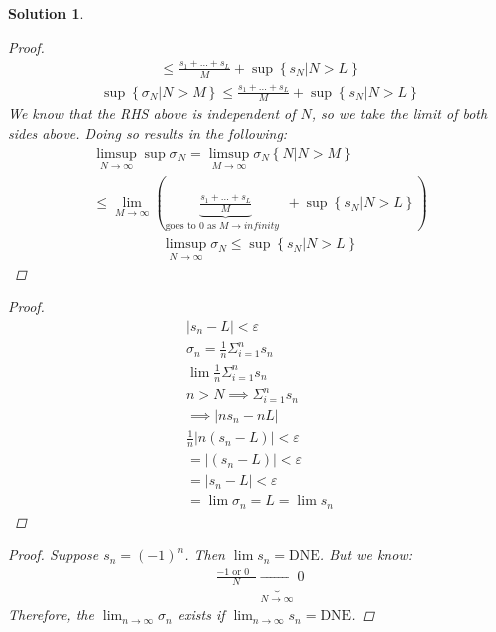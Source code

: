\documentclass[12pt]{article}
\newtheorem{solution}{Solution}
\begin{document}
\begin{solution}
\begin{enumerate}
\begin{proof}
\begin{align}
                \leq \frac{s_{1} +\ldots +s_{L}  }{M}+\sup \left\{ s_{N} |N>L \right\} 
            \end{align}
            \begin{align}
                \sup \left\{ \sigma_{N} |N>M \right\} \leq \frac{s_{1} +\ldots +s_{L}  }{M}+\sup \left\{ s_{N} |N>L \right\} 
            \end{align}
            We know that the RHS above is independent of $N$, so we take the limit of both sides above. Doing so results in the following: 
            \begin{align}
                \limsup_{N \to \infty} \sup \sigma_{N} =\limsup_{M \to \infty} \sigma_{N} \left\{ N|N>M \right\}\\[10pt] 
                \leq \lim_{M \to \infty} (\underbrace{\frac{s_{1} +\ldots +s_{L}}{M}}_{\text{goes to $0$  as $M\to infinity$ } } +\sup \left\{ s_{N} |N>L \right\} )
            \end{align}
            \begin{align}
             \limsup_{N \to \infty} \sigma_{N} \leq \sup \left\{ s_{N} |N>L \right\} 
            \end{align}
       \end{proof}
        \item \begin{proof}
           \begin{align}
            \left\vert s_{n} -L \right\vert < \varepsilon \\[10pt] 
            \sigma_{n} = \frac{1}{n} \Sigma_{i=1}^{n}s_{n} \\[10pt] 
            \lim \frac{1}{n}\Sigma_{i=1}^{n}s_{n}\\[10pt]  
            n>N \implies \Sigma_{i=1}^{n}s_{n} \\[10pt] 
            \implies \left\vert ns_{n} -nL \right\vert \\[10pt] 
            \frac{1}{n}\left\vert n(s_{n} -L) \right\vert <\varepsilon \\[10pt] 
            =\left\vert (s_{n} -L) \right\vert <\varepsilon \\[10pt] 
            = \left\vert s_{n} -L \right\vert <\varepsilon \\[10pt] 
            = \lim \sigma_{n} = L=\lim s_{n}  
           \end{align}  
        \end{proof}
        \begin{proof}
         \item Suppose $s_{n} = (-1)^n$. Then $\lim s_{n} = \text{DNE} $. But we know:
        \begin{align}
            \frac{\text{$-1$ or $0$  } }{N} \underbrace{\to }_{N\to \infty } 0
        \end{align}
        Therefore, the $\lim_{n \to \infty} \sigma_{n}$  exists if $\lim_{n \to \infty} s_{n}=\text{DNE} $. 
        \end{proof}

    \end{enumerate}
\end{solution}
\end{document}
